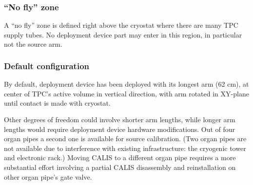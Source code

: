 \subsubsection{``No fly'' zone}
A ``no fly'' zone is defined right above the cryostat where there are many TPC supply tubes. No deployment device part may enter in this region, in particular not the source arm.


\subsubsection{Default configuration}
By default, deployment device has been deployed with its longest arm (62 cm), at center of TPC's active volume in vertical direction, with arm rotated in XY-plane until contact is made with cryostat. 

Other degrees of freedom could involve shorter arm lengths, while longer arm lengths would require deployment device hardware modifications. Out of four organ pipes a second one is available for source calibration. (Two organ pipes are not available due to interference with existing infrastructure: the cryogenic tower and electronic rack.) Moving CALIS to a different organ pipe requires a more substantial effort involving a partial CALIS disassembly and reinstallation on other organ pipe's gate valve.

